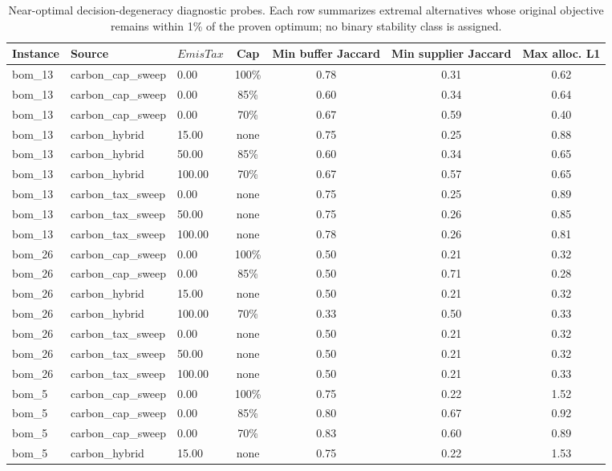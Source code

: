 \begin{table}[!htbp]\centering\small
\caption{Near-optimal decision-degeneracy diagnostic probes. Each row summarizes extremal alternatives whose original objective remains within 1\% of the proven optimum; no binary stability class is assigned.}\label{tab:stability}
\begin{tabular}{lllcccc}
\toprule
Instance & Source & $EmisTax$ & Cap & Min buffer Jaccard & Min supplier Jaccard & Max alloc. L1\\
\midrule
bom\_13 & carbon\_cap\_sweep & 0.00 & 100\% & 0.78 & 0.31 & 0.62 \\
bom\_13 & carbon\_cap\_sweep & 0.00 & 85\% & 0.60 & 0.34 & 0.64 \\
bom\_13 & carbon\_cap\_sweep & 0.00 & 70\% & 0.67 & 0.59 & 0.40 \\
bom\_13 & carbon\_hybrid & 15.00 & none & 0.75 & 0.25 & 0.88 \\
bom\_13 & carbon\_hybrid & 50.00 & 85\% & 0.60 & 0.34 & 0.65 \\
bom\_13 & carbon\_hybrid & 100.00 & 70\% & 0.67 & 0.57 & 0.65 \\
bom\_13 & carbon\_tax\_sweep & 0.00 & none & 0.75 & 0.25 & 0.89 \\
bom\_13 & carbon\_tax\_sweep & 50.00 & none & 0.75 & 0.26 & 0.85 \\
bom\_13 & carbon\_tax\_sweep & 100.00 & none & 0.78 & 0.26 & 0.81 \\
bom\_26 & carbon\_cap\_sweep & 0.00 & 100\% & 0.50 & 0.21 & 0.32 \\
bom\_26 & carbon\_cap\_sweep & 0.00 & 85\% & 0.50 & 0.71 & 0.28 \\
bom\_26 & carbon\_hybrid & 15.00 & none & 0.50 & 0.21 & 0.32 \\
bom\_26 & carbon\_hybrid & 100.00 & 70\% & 0.33 & 0.50 & 0.33 \\
bom\_26 & carbon\_tax\_sweep & 0.00 & none & 0.50 & 0.21 & 0.32 \\
bom\_26 & carbon\_tax\_sweep & 50.00 & none & 0.50 & 0.21 & 0.32 \\
bom\_26 & carbon\_tax\_sweep & 100.00 & none & 0.50 & 0.21 & 0.33 \\
bom\_5 & carbon\_cap\_sweep & 0.00 & 100\% & 0.75 & 0.22 & 1.52 \\
bom\_5 & carbon\_cap\_sweep & 0.00 & 85\% & 0.80 & 0.67 & 0.92 \\
bom\_5 & carbon\_cap\_sweep & 0.00 & 70\% & 0.83 & 0.60 & 0.89 \\
bom\_5 & carbon\_hybrid & 15.00 & none & 0.75 & 0.22 & 1.53 \\

\end{tabular}
\end{table}
